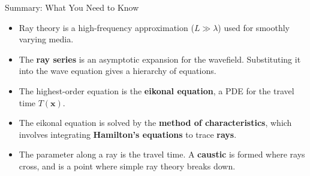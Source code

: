 \documentclass{beamer}
\begin{document}

\begin{frame}{Summary: What You Need to Know}
    \begin{itemize}
        \item Ray theory is a high-frequency approximation ($L \gg \lambda$) used for smoothly varying media.
        \pause
        \item The \textbf{ray series} is an asymptotic expansion for the wavefield. Substituting it into the wave equation gives a hierarchy of equations.
        \pause
        \item The highest-order equation is the \textbf{eikonal equation}, a PDE for the travel time $T(\mathbf{x})$.
        \pause
        \item The eikonal equation is solved by the \textbf{method of characteristics}, which involves integrating \textbf{Hamilton's equations} to trace \textbf{rays}.
        \pause
        \item The parameter along a ray is the travel time. A \textbf{caustic} is formed where rays cross, and is a point where simple ray theory breaks down.
    \end{itemize}
\end{frame}
\end{document}
